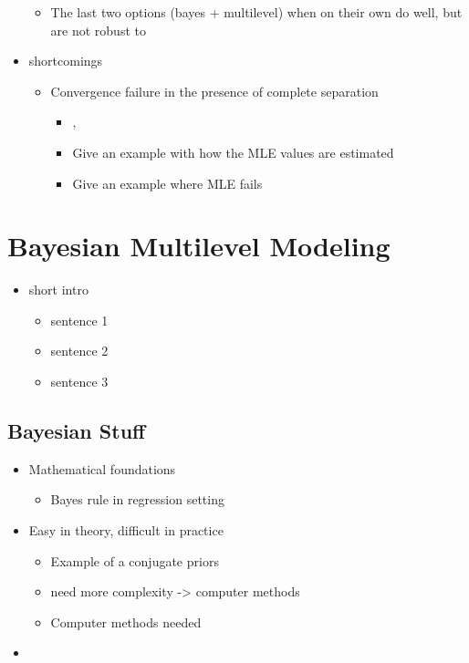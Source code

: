 \documentclass[11pt, oneside]{book}
\providecommand{\tightlist}{%
  \setlength{\itemsep}{0pt}\setlength{\parskip}{0pt}}
\begin{document}
\begin{itemize}
  \begin{itemize}
  \tightlist
  \item
    The last two options (bayes + multilevel) when on their own do well, but are not robust to
  \end{itemize}
\item
  shortcomings

  \begin{itemize}
  \tightlist
  \item
    Convergence failure in the presence of complete separation

    \begin{itemize}
    \tightlist
    \item
      \citep{prins2019too}, \citep{ghosh2018use}
    \item
      Give an example with how the MLE values are estimated
    \item
      Give an example where MLE fails
    \end{itemize}
  \end{itemize}
\end{itemize}

\hypertarget{bayesian-modeling}{%
\chapter{Bayesian Multilevel Modeling}\label{bayesian-modeling}}

\begin{itemize}
\tightlist
\item
  short intro

  \begin{itemize}
  \tightlist
  \item
    sentence 1
  \item
    sentence 2
  \item
    sentence 3
  \end{itemize}
\end{itemize}

\hypertarget{bayesian-stuff}{%
\section{Bayesian Stuff}\label{bayesian-stuff}}

\begin{itemize}
\item
  Mathematical foundations

  \begin{itemize}
  \tightlist
  \item
    Bayes rule in regression setting
  \end{itemize}
\item
  Easy in theory, difficult in practice

  \begin{itemize}
  \tightlist
  \item
    Example of a conjugate priors
  \item
    need more complexity -\textgreater{} computer methods
  \item
    Computer methods needed
  \end{itemize}
\item
\end{itemize}
\end{document}
